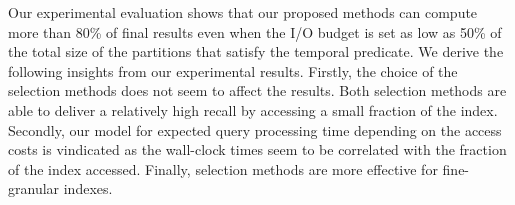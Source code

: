 Our experimental evaluation shows that our proposed methods can
compute more than 80\% of final results even when the I/O budget is
set as low as 50\% of the total size of the partitions that satisfy
the temporal predicate. We derive the following insights from our experimental results. Firstly, the choice of the selection methods does not seem to affect the results. Both selection methods are able to deliver a relatively high recall by accessing a small fraction of the index. Secondly, our model for expected query processing time depending on the access costs is vindicated as the wall-clock times seem to be correlated with the fraction of the index accessed. Finally, selection methods are more effective for fine-granular indexes.



